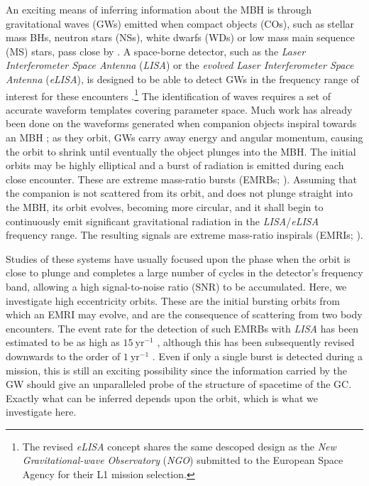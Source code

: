 \documentclass[useAMS,usedcolumn,usegraphicx,usenatbib]{mn2e}
\newcommand{\units}[1]{\ensuremath{~\mathrm{#1}}}
\begin{document}
An exciting means of inferring information about the MBH is through gravitational waves (GWs) emitted when compact objects (COs), such as stellar mass BHs, neutron stars (NSs), white dwarfs (WDs) or low mass main sequence (MS) stars, pass close by \citep{Sathyaprakash2009}. A space-borne detector, such as the \textit{Laser Interferometer Space Antenna} (\textit{LISA}) or the \textit{evolved Laser Interferometer Space Antenna} (\textit{eLISA}), is designed to be able to detect GWs in the frequency range of interest for these encounters \citep{Bender1998, Danzmann2003, Jennrich2011, Amaro-Seoane2012a}.\footnote{The revised \textit{eLISA} concept shares the same descoped design as the \textit{New Gravitational-wave Observatory} (\textit{NGO}) submitted to the European Space Agency for their L1 mission selection.} The identification of waves requires a set of accurate waveform templates covering parameter space. Much work has already been done on the waveforms generated when companion objects inspiral towards an MBH \citep{Glampedakis2005, Barack2009}; as they orbit, GWs carry away energy and angular momentum, causing the orbit to shrink until eventually the object plunges into the MBH. The initial orbits may be highly elliptical and a burst of radiation is emitted during each close encounter. These are extreme mass-ratio bursts (EMRBs; \citealt*{Rubbo2006}). Assuming that the companion is not scattered from its orbit, and does not plunge straight into the MBH, its orbit evolves, becoming more circular, and it shall begin to continuously emit significant gravitational radiation in the \textit{LISA}/\textit{eLISA} frequency range. The resulting signals are extreme mass-ratio inspirals (EMRIs; \citealt{Amaro-Seoane2007}).

Studies of these systems have usually focused upon the phase when the orbit is close to plunge and completes a large number of cycles in the detector's frequency band, allowing a high signal-to-noise ratio (SNR) to be accumulated. Here, we investigate high eccentricity orbits. These are the initial bursting orbits from which an EMRI may evolve, and are the consequence of scattering from two body encounters. The event rate for the detection of such EMRBs with \textit{LISA} has been estimated to be as high as $15\units{yr^{-1}}$ \citep{Rubbo2006}, although this has been subsequently revised downwards to the order of $1\units{yr^{-1}}$ \citep*{Hopman2007}. Even if only a single burst is detected during a mission, this is still an exciting possibility since the information carried by the GW should give an unparalleled probe of the structure of spacetime of the GC. Exactly what can be inferred depends upon the orbit, which is what we investigate here. 
\end{document}
